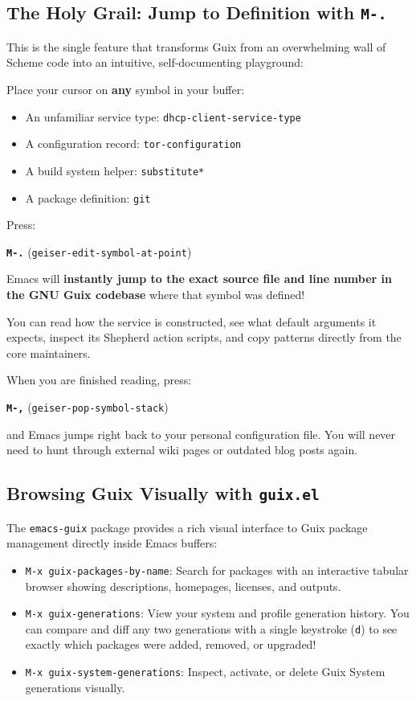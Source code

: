 \subsection{The Holy Grail: Jump to Definition with \texttt{M-.}}

This is the single feature that transforms Guix from an overwhelming wall of Scheme code into an intuitive, self-documenting playground:

Place your cursor on \textbf{any} symbol in your buffer:
\begin{itemize}
  \item An unfamiliar service type: \texttt{dhcp-client-service-type}
  \item A configuration record: \texttt{tor-configuration}
  \item A build system helper: \texttt{substitute*}
  \item A package definition: \texttt{git}
\end{itemize}

Press:
\begin{center}
\Large\textbf{\texttt{M-.}} \normalsize\quad (\texttt{geiser-edit-symbol-at-point})
\end{center}

Emacs will \textbf{instantly jump to the exact source file and line number in the GNU Guix codebase} where that symbol was defined! 

You can read how the service is constructed, see what default arguments it expects, inspect its Shepherd action scripts, and copy patterns directly from the core maintainers.

When you are finished reading, press:
\begin{center}
\Large\textbf{\texttt{M-,}} \normalsize\quad (\texttt{geiser-pop-symbol-stack})
\end{center}
and Emacs jumps right back to your personal configuration file. You will never need to hunt through external wiki pages or outdated blog posts again.

\subsection{Browsing Guix Visually with \texttt{guix.el}}

The \texttt{emacs-guix} package provides a rich visual interface to Guix package management directly inside Emacs buffers:

\begin{itemize}
  \item \texttt{M-x guix-packages-by-name}: Search for packages with an interactive tabular browser showing descriptions, homepages, licenses, and outputs.
  \item \texttt{M-x guix-generations}: View your system and profile generation history. You can compare and diff any two generations with a single keystroke (\texttt{d}) to see exactly which packages were added, removed, or upgraded!
  \item \texttt{M-x guix-system-generations}: Inspect, activate, or delete Guix System generations visually.
\end{itemize}

